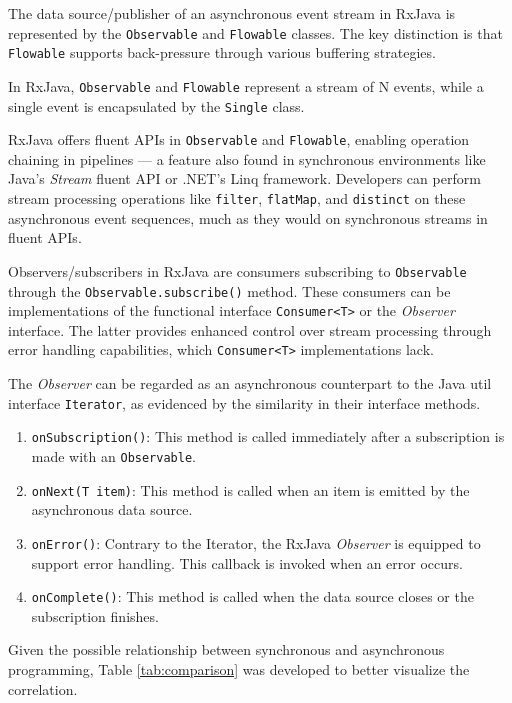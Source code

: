 The data source/publisher of an asynchronous event stream in RxJava is represented by the \texttt{Observable} and \texttt{Flowable} classes. The key distinction is that \texttt{Flowable} supports back-pressure through various buffering strategies.

In RxJava, \texttt{Observable} and \texttt{Flowable} represent a stream of N events, while a single event is encapsulated by the \texttt{Single} class.

RxJava offers fluent APIs in \texttt{Observable} and \texttt{Flowable}, enabling operation chaining in pipelines — a feature also found in synchronous environments like Java's \textit{Stream} fluent API or .NET's Linq framework. Developers can perform stream processing operations like \texttt{filter}, \texttt{flatMap}, and \texttt{distinct} on these asynchronous event sequences, much as they would on synchronous streams in fluent APIs.

Observers/subscribers in RxJava are consumers subscribing to \texttt{Observable} through the \texttt{Observable.subscribe()} method. These consumers can be implementations of the functional interface \texttt{Consumer<T>} or the \textit{Observer} interface. The latter provides enhanced control over stream processing through error handling capabilities, which \texttt{Consumer<T>} implementations lack.

The \textit{Observer} can be regarded as an asynchronous counterpart to the Java util interface \texttt{Iterator}, as evidenced by the similarity in their interface methods.
\begin{enumerate}
    \item \texttt{onSubscription()}: This method is called immediately after a subscription is made with an \texttt{Observable}.
    \item \texttt{onNext(T item)}: This method is called when an item is emitted by the asynchronous data source.
    \item \texttt{onError()}: Contrary to the Iterator, the RxJava \textit{Observer} is equipped to support error handling. This callback is invoked when an error occurs.
    \item \texttt{onComplete()}: This method is called when the data source closes or the subscription finishes.
\end{enumerate}

Given the possible relationship between synchronous and asynchronous programming, Table \ref{tab:comparison} was developed to better visualize the correlation.


